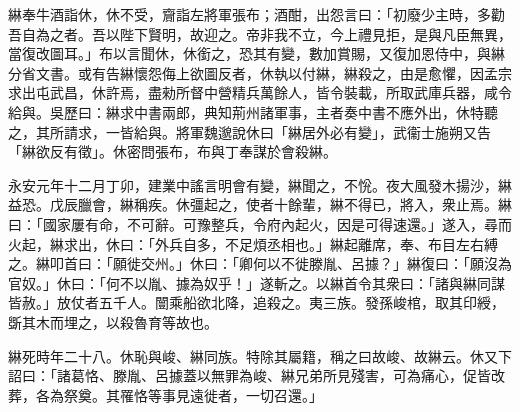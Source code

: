 \begin{pinyinscope}
綝奉牛酒詣休，休不受，齎詣左將軍張布；酒酣，出怨言曰：「初廢少主時，多勸吾自為之者。吾以陛下賢明，故迎之。帝非我不立，今上禮見拒，是與凡臣無異，當復改圖耳。」布以言聞休，休銜之，恐其有變，數加賞賜，又復加恩侍中，與綝分省文書。或有告綝懷怨侮上欲圖反者，休執以付綝，綝殺之，由是愈懼，因孟宗求出屯武昌，休許焉，盡勑所督中營精兵萬餘人，皆令裝載，所取武庫兵器，咸令給與。吳歷曰：綝求中書兩郎，典知荊州諸軍事，主者奏中書不應外出，休特聽之，其所請求，一皆給與。將軍魏邈說休曰「綝居外必有變」，武衞士施朔又告「綝欲反有徵」。休密問張布，布與丁奉謀於會殺綝。

永安元年十二月丁卯，建業中謠言明會有變，綝聞之，不恱。夜大風發木揚沙，綝益恐。戊辰臘會，綝稱疾。休彊起之，使者十餘輩，綝不得已，將入，衆止焉。綝曰：「國家屢有命，不可辭。可豫整兵，令府內起火，因是可得速還。」遂入，尋而火起，綝求出，休曰：「外兵自多，不足煩丞相也。」綝起離席，奉、布目左右縛之。綝叩首曰：「願徙交州。」休曰：「卿何以不徙滕胤、呂據？」綝復曰：「願沒為官奴。」休曰：「何不以胤、據為奴乎！」遂斬之。以綝首令其衆曰：「諸與綝同謀皆赦。」放仗者五千人。闓乘船欲北降，追殺之。夷三族。發孫峻棺，取其印綬，斲其木而埋之，以殺魯育等故也。

綝死時年二十八。休恥與峻、綝同族。特除其屬籍，稱之曰故峻、故綝云。休又下詔曰：「諸葛恪、滕胤、呂據蓋以無罪為峻、綝兄弟所見殘害，可為痛心，促皆改葬，各為祭奠。其罹恪等事見遠徙者，一切召還。」


\end{pinyinscope}